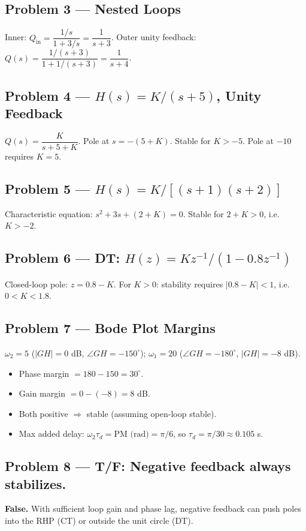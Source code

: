 \documentclass[11pt]{article}
\begin{document}
\subsection{Problem 3 --- Nested Loops}
Inner: $Q_{\text{in}} = \dfrac{1/s}{1+3/s} = \dfrac{1}{s+3}$. Outer unity feedback: $Q(s) = \dfrac{1/(s+3)}{1+1/(s+3)} = \dfrac{1}{s+4}$.

\subsection{Problem 4 --- $H(s)=K/(s+5)$, Unity Feedback}
$Q(s) = \dfrac{K}{s+5+K}$. Pole at $s=-(5+K)$. Stable for $K > -5$. Pole at $-10$ requires $K = 5$.

\subsection{Problem 5 --- $H(s)=K/[(s+1)(s+2)]$}
Characteristic equation: $s^2 + 3s + (2+K) = 0$. Stable for $2+K>0$, i.e.\ $K>-2$.

\subsection{Problem 6 --- DT: $H(z) = K z^{-1}/(1-0.8 z^{-1})$}
Closed-loop pole: $z = 0.8 - K$. For $K>0$: stability requires $|0.8-K|<1$, i.e.\ $0 < K < 1.8$.

\subsection{Problem 7 --- Bode Plot Margins}
$\omega_2=5$ ($|GH|=0$ dB, $\angle GH=-150^\circ$); $\omega_1=20$ ($\angle GH=-180^\circ$, $|GH|=-8$ dB).
\begin{itemize}[nosep]
  \item Phase margin $= 180 - 150 = 30^\circ$.
  \item Gain margin $= 0 - (-8) = 8$ dB.
  \item Both positive $\Rightarrow$ stable (assuming open-loop stable).
  \item Max added delay: $\omega_2\tau_d = \text{PM (rad)} = \pi/6$, so $\tau_d = \pi/30 \approx 0.105$ s.
\end{itemize}

\subsection{Problem 8 --- T/F: Negative feedback always stabilizes.}
\textbf{False.} With sufficient loop gain and phase lag, negative feedback can push poles into the RHP (CT) or outside the unit circle (DT).
\end{document}

